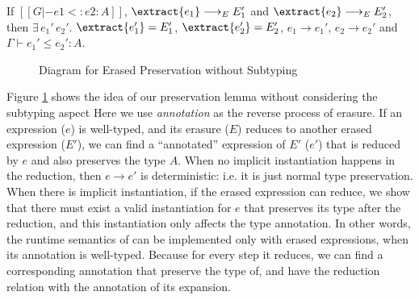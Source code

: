 \begin{theorem}
    If $[[G |- e1 <: e2 : A]]$, $\extract{e_1} \longrightarrow_E E_1'$ and $\extract{e_2} \longrightarrow_E E_2'$,
    then $\exists\,e_1' \, e_2'.$ $\extract{e_1'} = E_1'$, $\extract{e_2'} = E_2'$, $e_1 \longrightarrow e_1'$, $e_2 \longrightarrow e_2'$ and $\Gamma \vdash e_1' \le e_2' : A$.
\end{theorem}

\begin{figure}
    \centering
    \caption{Diagram for Erased Preservation without Subtyping}
    \label{fig:preservation}
\end{figure}


\noindent Figure \ref{fig:preservation} shows the idea of our preservation lemma without
considering the subtyping aspect
Here we use \emph{annotation} as the reverse process of erasure.
If an expression ($e$) is well-typed, and its erasure ($E$)
reduces to another erased expression ($E'$), we can find a ``annotated''
expression of $E'$ ($e'$) that is reduced by $e$ and also preserves the type $A$.
When no implicit instantiation happens in the reduction, then $e \longrightarrow e'$
is deterministic: i.e. it is just normal type preservation. When there is implicit
instantiation, if the erased expression can reduce, we show that there must
exist a valid instantiation for $e$ that preserves its type after the reduction, and
this instantiation only affects the type annotation.
In other words, the runtime semantics of \name can be implemented only with
erased expressions, when its annotation is well-typed.
Because for every step it reduces, we can find a corresponding annotation that
preserve the type of, and have the reduction relation with the
annotation of its expansion.

